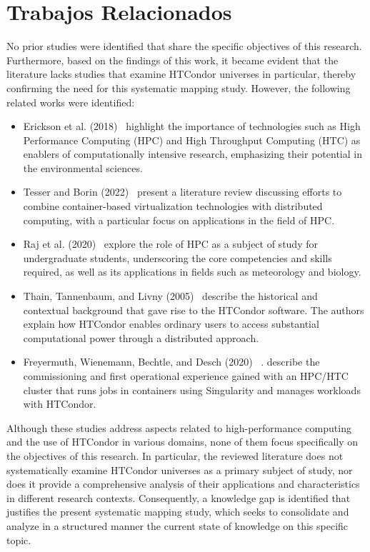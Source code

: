 \section{Trabajos Relacionados}\label{sec:trabajos-relacionados}
No prior studies were identified that share the specific objectives of this research. Furthermore, based on the findings of this work, it became evident that the literature lacks studies that examine HTCondor universes in particular, thereby confirming the need for this systematic mapping study.
However, the following related works were identified:
\begin{itemize}[label=\textbf{--}]
	\item Erickson et al. (2018)~\cite{EricksonA-01} highlight the importance of technologies such as High Performance Computing (HPC) and High Throughput Computing (HTC) as enablers of computationally intensive research, emphasizing their potential in the environmental sciences.
	\item Tesser and Borin (2022)~\cite{KellerTesser2023} present a literature review discussing efforts to combine container-based virtualization technologies with distributed computing, with a particular focus on applications in the field of HPC.
	\item Raj et al. (2020)~\cite{RajRomanowski2020} explore the role of HPC as a subject of study for undergraduate students, underscoring the core competencies and skills required, as well as its applications in fields such as meteorology and biology.
	\item Thain, Tannenbaum, and Livny (2005)~\cite{Livny-Tannenbaum2005} describe the historical and contextual background that gave rise to the HTCondor software. The authors explain how HTCondor enables ordinary users to access substantial computational power through a distributed approach.
	\item Freyermuth, Wienemann, Bechtle, and Desch (2020) ~\cite{Freyermuth2021a}. describe the commissioning and first operational experience gained with an HPC/HTC cluster that runs jobs in containers using Singularity and manages workloads with HTCondor.
\end{itemize}

Although these studies address aspects related to high-performance computing and the use of HTCondor in various domains, none of them focus specifically on the objectives of this research. In particular, the reviewed literature does not systematically examine HTCondor universes as a primary subject of study, nor does it provide a comprehensive analysis of their applications and characteristics in different research contexts. Consequently, a knowledge gap is identified that justifies the present systematic mapping study, which seeks to consolidate and analyze in a structured manner the current state of knowledge on this specific topic.




